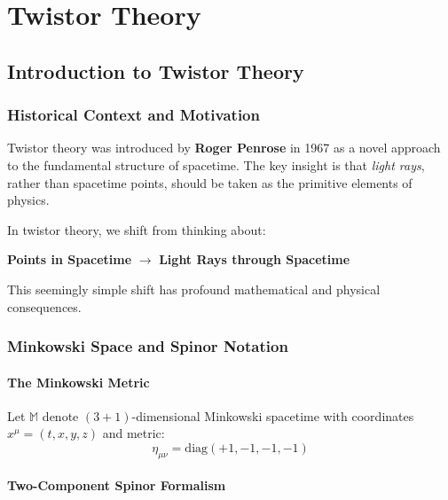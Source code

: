 \documentclass[11pt,a4paper,twoside]{book}
\theoremstyle{definition}
\newcommand{\Minkowski}{\mathbb{M}}
\begin{document}
\part{Twistor Theory}

\chapter{Introduction to Twistor Theory}
\label{ch:twistor_intro}

\section{Historical Context and Motivation}

Twistor theory was introduced by \textbf{Roger Penrose} in 1967 as a novel 
approach to the fundamental structure of spacetime. The key insight is that 
\emph{light rays}, rather than spacetime points, should be taken as the 
primitive elements of physics.

\begin{conceptbox}
In twistor theory, we shift from thinking about:
\begin{center}
\textbf{Points in Spacetime} $\longrightarrow$ \textbf{Light Rays through Spacetime}
\end{center}
This seemingly simple shift has profound mathematical and physical consequences.
\end{conceptbox}

\section{Minkowski Space and Spinor Notation}

\subsection{The Minkowski Metric}

Let $\Minkowski$ denote $(3+1)$-dimensional Minkowski spacetime with coordinates 
$x^{\mu} = (t, x, y, z)$ and metric:
\begin{equation}
    \eta_{\mu\nu} = \text{diag}(+1, -1, -1, -1)
\end{equation}

\subsection{Two-Component Spinor Formalism}
\end{document}
